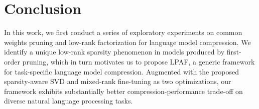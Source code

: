 \section{Conclusion}
In this work, we first conduct a series of exploratory experiments on common weights 
pruning and low-rank factorization for language model compression. 
We identify a unique low-rank sparsity phenomenon in models produced by first-order pruning, 
which in turn motivates us to propose LPAF, a generic framework for task-specific language model compression. 
Augmented with the proposed sparsity-aware SVD and mixed-rank fine-tuning as two optimizations, our framework exhibits 
substantially better compression-performance trade-off on diverse natural language processing tasks.

